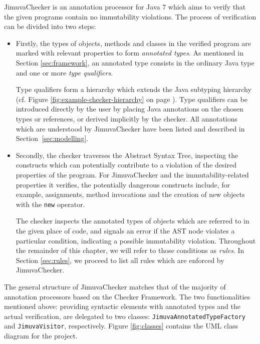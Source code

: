 \documentclass{pracamgr}
\theoremstyle{break}
\theoremstyle{break}
\theoremstyle{break}
\begin{document}
JimuvaChecker is an annotation processor for Java 7 which aims to
verify that the given programs contain no immutability violations. The
process of verification can be divided into two steps:
\begin{itemize}
\item Firstly, the types of objects, methods and classes in the
  verified program are marked with relevant properties to form
  \emph{annotated types}. As mentioned in Section \ref{sec:framework},
  an annotated type consists in the ordinary Java type and one or more
  \emph{type qualifiers}.

  Type qualifiers form a hierarchy which extends the Java subtyping
  hierarchy (cf. Figure \ref{fig:example-checker-hierarchy} on page
  \pageref{fig:example-checker-hierarchy}). Type qualifiers can be
  introduced directly by the user by placing Java annotations on the
  chosen types or references, or derived implicitly by the
  checker. All annotations which are understood by JimuvaChecker have
  been listed and described in Section~\ref{sec:modelling}.
\item Secondly, the checker traverses the Abstract Syntax Tree,
  inspecting the constructs which can potentially contribute to a
  violation of the desired properties of the program. For
  JimuvaChecker and the immutability-related properties it verifies,
  the potentially dangerous constructs include, for example,
  assignments, method invocations and the creation of new objects
  with the \texttt{new} operator. 

  The checker inspects the annotated types of objects which are
  referred to in the given place of code, and signals an error if the
  AST node violates a particular condition, indicating a possible
  immutability violation. Throughout the remainder of this chapter, we
  will refer to those conditions as \emph{rules}. In Section
  \ref{sec:rules}, we proceed to list all rules which are enforced by
  JimuvaChecker.
\end{itemize}

The general structure of JimuvaChecker matches that of the majority of
annotation processors based on the Checker Framework. The two
functionalities mentioned above: providing syntactic elements with
annotated types and the actual verification, are delegated to two
classes: \texttt{JimuvaAnnotatedTypeFactory} and
\texttt{JimuvaVisitor}, respectively. Figure \ref{fig:classes}
contains the UML class diagram for the project.

\newcommand{\cln}[1]{\textbf{\small{#1}}}
\end{document}
